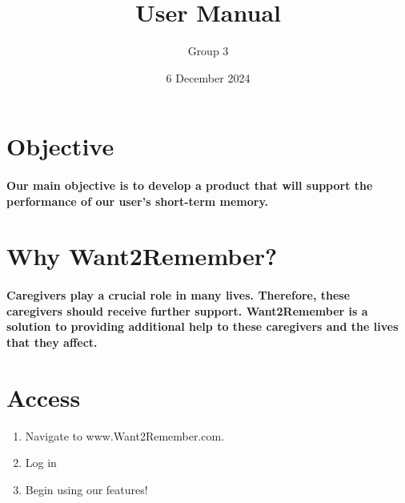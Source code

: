 \documentclass{article}
\title{User Manual}
\author{Group 3}
\date{6 December 2024}
\begin{document}
\maketitle
\newpage

\tableofcontents
\newpage

\section{Objective}
\paragraph{Our main objective is to develop a product that will support the performance of our user's short-term memory.}

\section{Why Want2Remember?}
\paragraph{Caregivers play a crucial role in many lives. Therefore, these caregivers should receive further support. Want2Remember is a solution to providing additional help to these caregivers and the lives that they affect.}
\section{Access}
\begin{enumerate}
    \item Navigate to www.Want2Remember.com.
    \item Log in
    \item Begin using our features!
\end{enumerate}
\end{document}
